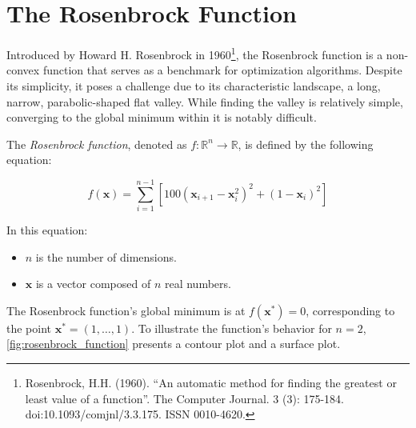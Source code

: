 \section{The Rosenbrock Function}
\label{sec:test_functions:rosenbrock}

  Introduced by Howard H. Rosenbrock in 1960\footnote{
    Rosenbrock, H.H. (1960). \enquote{An automatic method for finding the
    greatest or least value of a function}. The Computer Journal. 3 (3): 
    175-184. doi:10.1093/comjnl/3.3.175. ISSN 0010-4620.
  }, the Rosenbrock function is a non-convex function that serves as a benchmark
  for optimization algorithms.
  Despite its simplicity, it poses a challenge due to its characteristic
  landscape, a long, narrow, parabolic-shaped flat valley.
  While finding the valley is relatively simple, converging to the global
  minimum within it is notably difficult.

  \begin{definition}
    \label{def:rosenbrock_function}
    The \emph{Rosenbrock function}, denoted as \(f: \mathbb{R}^n \rightarrow 
    \mathbb{R}\), is defined by the following equation:

    \begin{equation}
    \label{eq:rosenbrock_function}
      f(\mathbf{x}) 
        = \sum_{i=1}^{n-1} \left[ 
          100 (\mathbf{x}_{i+1} - \mathbf{x}_i^2)^2 + (1 - \mathbf{x}_i)^2 
        \right]
    \end{equation}

    In this equation:

    \begin{itemize}
      \item \(n\) is the number of dimensions.
      \item \(\mathbf{x}\) is a vector composed of \(n\) real numbers.
    \end{itemize}
  \end{definition}

  The Rosenbrock function's global minimum is at \(f(\mathbf{x}^*) = 0\), 
  corresponding to the point \(\mathbf{x}^* = (1, \ldots, 1)\).
  To illustrate the function's behavior for \(n = 2\), 
  \vref{fig:rosenbrock_function} presents a contour plot and a surface plot.

